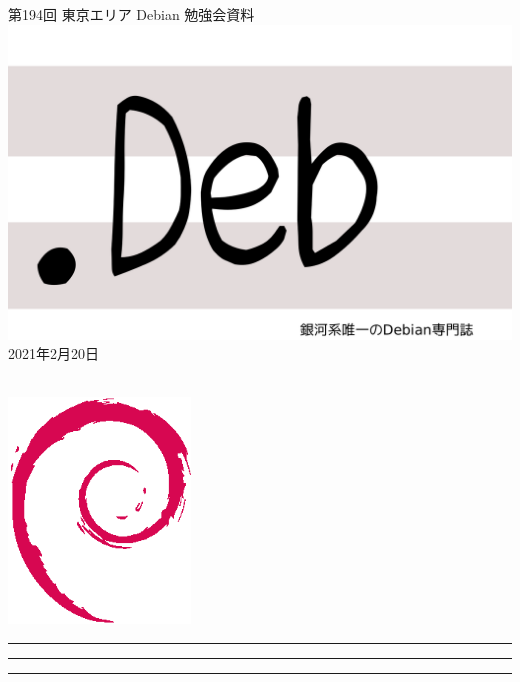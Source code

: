 \documentclass[mingoth,a4paper]{jsarticle}
\newcommand{\debmtgyear}{2021}
\newcommand{\debmtgmonth}{2}
\newcommand{\debmtgdate}{20}
\newcommand{\debmtgnumber}{194}
\begin{document}
\begin{titlepage}
\thispagestyle{empty}

\vspace*{-2cm}
第\debmtgnumber{}回 東京エリア Debian 勉強会資料\\
\hspace*{-2cm}
\includegraphics{image-assets/dotdeb.pdf}\\
\hfill{}\debmtgyear{}年\debmtgmonth{}月\debmtgdate{}日

\\

\vspace*{-2cm}
\hfill{}\includegraphics[height=6cm]{image-assets/openlogo-nd.eps}
\end{titlepage}

\newpage

\begin{minipage}[b]{0.2\hsize}
 \colorbox{titleback}{}
\end{minipage}
\begin{minipage}[b]{0.8\hsize}
\hrule
\vspace{2mm}
\hrule
\begin{multicols}{2}
\tableofcontents
\end{multicols}
\vspace{2mm}
\hrule
\end{minipage}
\end{document}
